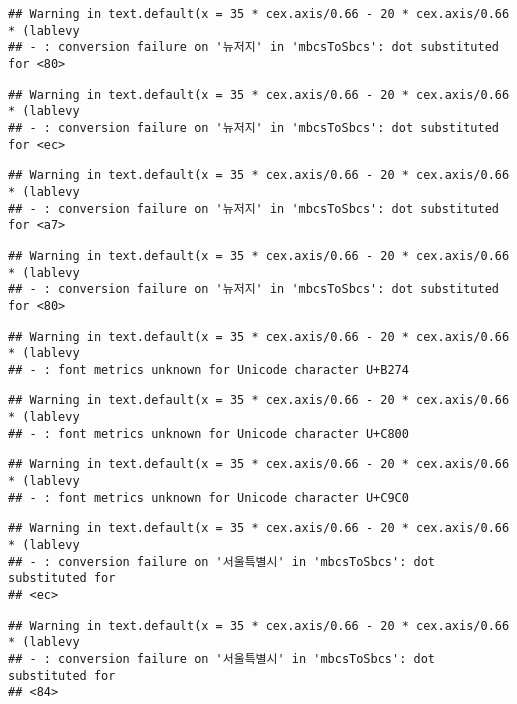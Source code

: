 \documentclass[
]{article}
\begin{document}
\begin{verbatim}
## Warning in text.default(x = 35 * cex.axis/0.66 - 20 * cex.axis/0.66 * (lablevy
## - : conversion failure on '뉴저지' in 'mbcsToSbcs': dot substituted for <80>
\end{verbatim}

\begin{verbatim}
## Warning in text.default(x = 35 * cex.axis/0.66 - 20 * cex.axis/0.66 * (lablevy
## - : conversion failure on '뉴저지' in 'mbcsToSbcs': dot substituted for <ec>
\end{verbatim}

\begin{verbatim}
## Warning in text.default(x = 35 * cex.axis/0.66 - 20 * cex.axis/0.66 * (lablevy
## - : conversion failure on '뉴저지' in 'mbcsToSbcs': dot substituted for <a7>
\end{verbatim}

\begin{verbatim}
## Warning in text.default(x = 35 * cex.axis/0.66 - 20 * cex.axis/0.66 * (lablevy
## - : conversion failure on '뉴저지' in 'mbcsToSbcs': dot substituted for <80>
\end{verbatim}

\begin{verbatim}
## Warning in text.default(x = 35 * cex.axis/0.66 - 20 * cex.axis/0.66 * (lablevy
## - : font metrics unknown for Unicode character U+B274
\end{verbatim}

\begin{verbatim}
## Warning in text.default(x = 35 * cex.axis/0.66 - 20 * cex.axis/0.66 * (lablevy
## - : font metrics unknown for Unicode character U+C800
\end{verbatim}

\begin{verbatim}
## Warning in text.default(x = 35 * cex.axis/0.66 - 20 * cex.axis/0.66 * (lablevy
## - : font metrics unknown for Unicode character U+C9C0
\end{verbatim}

\begin{verbatim}
## Warning in text.default(x = 35 * cex.axis/0.66 - 20 * cex.axis/0.66 * (lablevy
## - : conversion failure on '서울특별시' in 'mbcsToSbcs': dot substituted for
## <ec>
\end{verbatim}

\begin{verbatim}
## Warning in text.default(x = 35 * cex.axis/0.66 - 20 * cex.axis/0.66 * (lablevy
## - : conversion failure on '서울특별시' in 'mbcsToSbcs': dot substituted for
## <84>
\end{verbatim}
\end{document}
